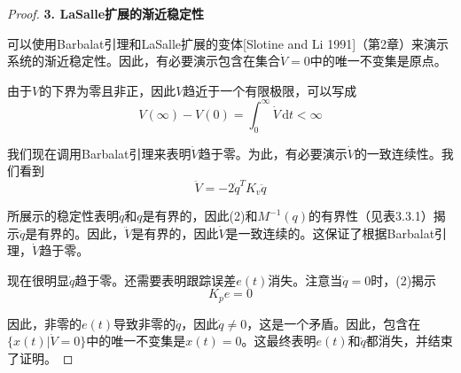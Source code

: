 \documentclass[UTF8]{ctexart}
\theoremstyle{definition}
\newcommand{\dd}{\mathrm{d}}
\begin{document}
\begin{proof}
\textbf{3. LaSalle扩展的渐近稳定性}

可以使用Barbalat引理和LaSalle扩展的变体[Slotine and Li 1991]（第2章）来演示系统的渐近稳定性。因此，有必要演示包含在集合$\dot{V} = 0$中的唯一不变集是原点。

由于$V$的下界为零且非正，因此$V$趋近于一个有限极限，可以写成
\begin{equation}
    V(\infty) - V(0) = \int_0^\infty \dot{V}\,\dd t < \infty
\end{equation}

我们现在调用Barbalat引理来表明$\dot{V}$趋于零。为此，有必要演示$\dot{V}$的一致连续性。我们看到
\begin{equation}
    \ddot{V} = -2\dot{q}^TK_v\ddot{q}
\end{equation}

所展示的稳定性表明$\dot{q}$和$q$是有界的，因此(2)和$M^{-1}(q)$的有界性（见表3.3.1）揭示$\ddot{q}$是有界的。因此，$\ddot{V}$是有界的，因此$\dot{V}$是一致连续的。这保证了根据Barbalat引理，$\dot{V}$趋于零。

现在很明显$\dot{q}$趋于零。还需要表明跟踪误差$e(t)$消失。注意当$\dot{q} = 0$时，(2)揭示
\begin{equation}
    K_pe = 0
\end{equation}

因此，非零的$e(t)$导致非零的$\ddot{q}$，因此$\dot{q} \neq 0$，这是一个矛盾。因此，包含在$\{x(t) | \dot{V} = 0\}$中的唯一不变集是$x(t) = 0$。这最终表明$e(t)$和$\dot{q}$都消失，并结束了证明。
\end{proof}
\end{document}
